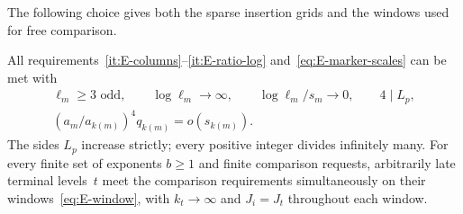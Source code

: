 The following choice gives both the sparse insertion grids and the windows used for free comparison.
\begin{lemma}\label{lem:E1.1}
All requirements~\ref{it:E-columns}--\ref{it:E-ratio-log} and~\eqref{eq:E-marker-scales} can be met with
\begin{gather*}
\ell_m\ge3\text{ odd},\qquad \log\ell_m\to\infty,
\qquad \log\ell_m/s_m\to0,\qquad4\mid L_p,\\
(a_m/a_{k(m)})^4q_{k(m)}=o(s_{k(m)}).
\end{gather*}
The sides $L_p$ increase strictly; every positive integer divides infinitely many. For every finite set of exponents $b\ge1$ and finite comparison requests, arbitrarily late terminal levels~$t$ meet the comparison requirements simultaneously on their windows~\eqref{eq:E-window}, with $k_t\to\infty$ and $J_i=J_t$ throughout each window.
\end{lemma}
